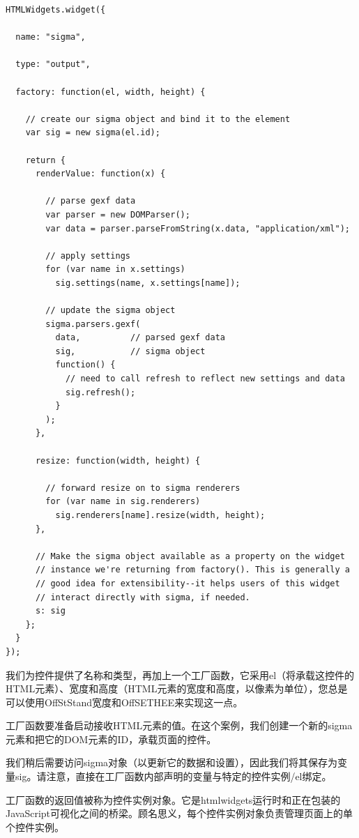 \documentclass[]{book}
\theoremstyle{definition}
\theoremstyle{definition}
\theoremstyle{definition}
\theoremstyle{remark}
\begin{document}
\begin{verbatim}
HTMLWidgets.widget({

  name: "sigma",
  
  type: "output",
  
  factory: function(el, width, height) {
  
    // create our sigma object and bind it to the element
    var sig = new sigma(el.id);
    
    return {
      renderValue: function(x) {
          
        // parse gexf data
        var parser = new DOMParser();
        var data = parser.parseFromString(x.data, "application/xml");
        
        // apply settings
        for (var name in x.settings)
          sig.settings(name, x.settings[name]);
        
        // update the sigma object
        sigma.parsers.gexf(
          data,          // parsed gexf data
          sig,           // sigma object
          function() {
            // need to call refresh to reflect new settings and data
            sig.refresh();
          }
        );
      },
      
      resize: function(width, height) {
        
        // forward resize on to sigma renderers
        for (var name in sig.renderers)
          sig.renderers[name].resize(width, height);  
      },
      
      // Make the sigma object available as a property on the widget
      // instance we're returning from factory(). This is generally a
      // good idea for extensibility--it helps users of this widget
      // interact directly with sigma, if needed.
      s: sig
    };
  }
});
\end{verbatim}

我们为控件提供了名称和类型，再加上一个工厂函数，它采用el（将承载这控件的HTML元素）、宽度和高度（HTML元素的宽度和高度，以像素为单位），您总是可以使用OffStStand宽度和OffSETHEE来实现这一点。

工厂函数要准备启动接收HTML元素的值。在这个案例，我们创建一个新的sigma元素和把它的DOM元素的ID，承载页面的控件。

我们稍后需要访问sigma对象（以更新它的数据和设置），因此我们将其保存为变量sig。请注意，直接在工厂函数内部声明的变量与特定的控件实例/el绑定。

工厂函数的返回值被称为控件实例对象。它是htmlwidgets运行时和正在包装的JavaScript可视化之间的桥梁。顾名思义，每个控件实例对象负责管理页面上的单个控件实例。
\end{document}
